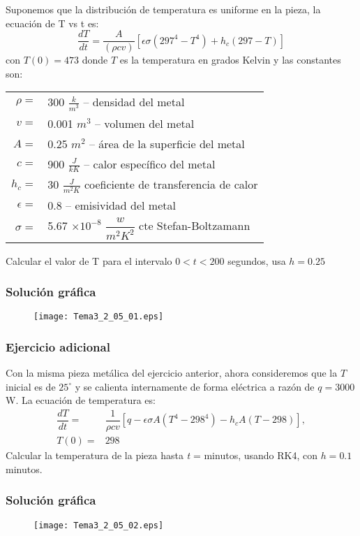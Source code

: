 \begin{frame}
Suponemos que la distribución de temperatura es uniforme en la pieza, la ecuación de T vs t es:
\[ \dfrac{dT}{dt} =  \dfrac{A}{(\rho c v)} [ \epsilon \sigma (297^{4} - T^{4})+ h_{c}(297-T)] \]
con $T(0)=473$ donde $T$ es la temperatura en grados Kelvin y las constantes son:
\end{frame}
\begin{frame}
\begin{tabular}{r l}
	$\rho =$  & 300 $\frac{k}{m^{3}}$ -- densidad del metal \\
	$v=$  & 0.001 $m^{3}$ -- volumen del metal \\
	$A=$ & 0.25 $m^{2}$ -- área de la superficie del metal \\
	$c=$ & 900 $\frac{J}{kK}$ -- calor específico del metal \\
	$h_{c}=$ & 30 $\frac{J}{m^{2}K}$ coeficiente de transferencia de calor \\
	$\epsilon=$ & 0.8 -- emisividad del metal \\
	$\sigma=$ & 5.67 $\times 10^{-8}$ $\dfrac{w}{m^{2}K^{2}}$ cte Stefan-Boltzamann
\end{tabular}
Calcular el valor de T para el intervalo $0 < t < 200$ segundos, usa $h=0.25$
\end{frame}
\begin{frame}
\frametitle{Solución gráfica}
\begin{figure}
	\centering
	\texttt{[image: Tema3\_2\_05\_01.eps]} 
\end{figure}
\end{frame}
\begin{frame}
\frametitle{Ejercicio adicional}
Con la misma pieza metálica del ejercicio anterior, ahora consideremos que la $T$ inicial es de $25^{\circ}$ y se calienta internamente de forma eléctrica a razón de $q=3000$ W. La ecuación de temperatura es:
\[ \begin{split}
\dfrac{dT}{dt} =& \dfrac{1}{\rho c v} \left[ q - \epsilon \sigma A \left( T^{4} - 298^{4} \right) - h_{c} A \left( T - 298 \right) \right], \\
 T(0) =& 298
 \end{split} \]
Calcular la temperatura de la pieza hasta \textit{t} = minutos, usando RK4, con $h=0.1$ minutos.
\end{frame}
\begin{frame}
\frametitle{Solución gráfica}
\begin{figure}
	\centering
	\texttt{[image: Tema3\_2\_05\_02.eps]} 
\end{figure}
\end{frame}
